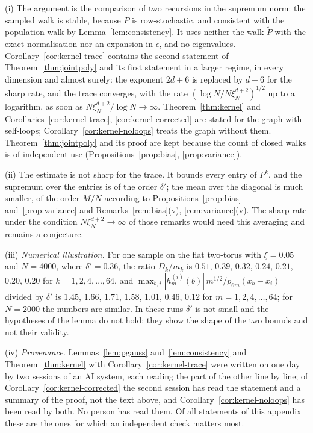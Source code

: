 \begin{remark}\label{rem:kernel}
(i) The argument is the comparison of two recursions in the supremum norm: the sampled walk is stable, because $P$ is row-stochastic, and consistent with the population walk by Lemma~\ref{lem:consistency}. It uses neither the walk $\tilde P$ with the exact normalisation nor an expansion in $\epsilon$, and no eigenvalues. Corollary~\ref{cor:kernel-trace} contains the second statement of Theorem~\ref{thm:jointpoly} and its first statement in a larger regime, in every dimension and almost surely: the exponent $2d+6$ is replaced by $d+6$ for the sharp rate, and the trace converges, with the rate $(\log N/N\xi_N^{d+2})^{1/2}$ up to a logarithm, as soon as $N\xi_N^{d+2}/\log N\to\infty$. Theorem~\ref{thm:kernel} and Corollaries~\ref{cor:kernel-trace}, \ref{cor:kernel-corrected} are stated for the graph with self-loops; Corollary~\ref{cor:kernel-noloops} treats the graph without them. Theorem~\ref{thm:jointpoly} and its proof are kept because the count of closed walks is of independent use (Propositions~\ref{prop:bias}, \ref{prop:variance}).

(ii) The estimate is not sharp for the trace. It bounds every entry of $P^k$, and the supremum over the entries is of the order $\delta'$; the mean over the diagonal is much smaller, of the order $M/N$ according to Propositions~\ref{prop:bias} and~\ref{prop:variance} and Remarks~\ref{rem:bias}(v), \ref{rem:variance}(v). The sharp rate under the condition $N\xi_N^{d+2}\to\infty$ of those remarks would need this averaging and remains a conjecture.

(iii) \emph{Numerical illustration.} For one sample on the flat two-torus with $\xi=0.05$ and $N=4000$, where $\delta'=0.36$, the ratio $D_k/m_k$ is $0.51$, $0.39$, $0.32$, $0.24$, $0.21$, $0.20$, $0.20$ for $k=1,2,4,\dots,64$, and $\max_{b,i}|h^{(i)}_m(b)|\,m^{1/2}/p_{6m}(x_b-x_i)$ divided by $\delta'$ is $1.45$, $1.66$, $1.71$, $1.58$, $1.01$, $0.46$, $0.12$ for $m=1,2,4,\dots,64$; for $N=2000$ the numbers are similar. In these runs $\delta'$ is not small and the hypotheses of the lemma do not hold; they show the shape of the two bounds and not their validity.

(iv) \emph{Provenance.} Lemmas~\ref{lem:pgauss} and~\ref{lem:consistency} and Theorem~\ref{thm:kernel} with Corollary~\ref{cor:kernel-trace} were written on one day by two sessions of an AI system, each reading the part of the other line by line; of Corollary~\ref{cor:kernel-corrected} the second session has read the statement and a summary of the proof, not the text above, and Corollary~\ref{cor:kernel-noloops} has been read by both. No person has read them. Of all statements of this appendix these are the ones for which an independent check matters most.
\end{remark}

